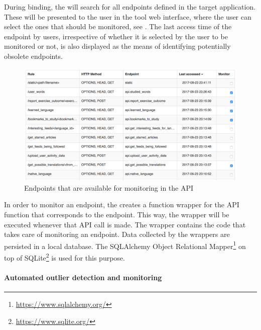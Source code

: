 \documentclass{sig-alternate-05-2015}
\begin{document}
  During binding, the \tool will search for all endpoints defined in the target application. These will be presented to the user in the tool web interface, where the user can select the ones that should be monitored, see . The last access time of the endpoint by users, irrespective of whether it is selected by the user to be monitored or not, is also displayed as the means of identifying potentially obsolete endpoints.

    \begin{figure}
      \centering
      \includegraphics[width=\linewidth]{selecting_endpoints.png}
      \caption{Endpoints that are available for monitoring in the \zee API}
      \label{fig:sep}
    \end{figure}

  In order to monitor an endpoint, the \tool creates a function wrapper for the API function that corresponds to the endpoint. This way, the wrapper will be executed whenever that API call is made. The wrapper contains the code that takes care of monitoring an endpoint. Data collected by the wrappers are persisted in a local database. The SQLAlchemy Object Relational Mapper\footnote{\url{https://www.sqlalchemy.org/}} on top of SQLite\footnote{\url{https://www.sqlite.org/}} is used for this purpose.

  
  \paragraph{Automated outlier detection and monitoring}
  
\end{document}
